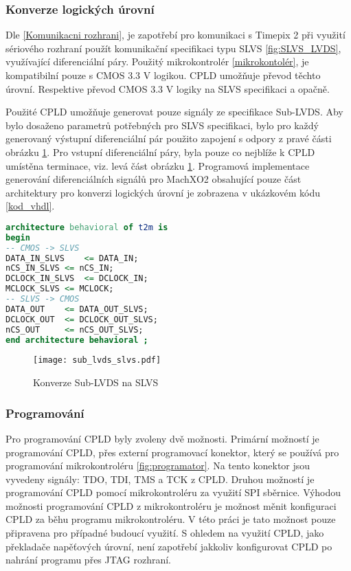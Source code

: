 	\subsubsection{Konverze logických úrovní}
	\label{CPLD konverze}
	Dle \ref{Komunikacni rozhrani}, je zapotřebí pro komunikaci s Timepix 2 při využití sériového rozhraní použít komunikační specifikaci typu SLVS \ref{fig:SLVS_LVDS}, využívající diferenciální páry. Použitý mikrokontrolér \ref{mikrokontolér}, je kompatibilní pouze s CMOS 3.3 V logikou. CPLD umožňuje převod těchto úrovní. Respektive převod CMOS 3.3 V logiky na SLVS specifikaci a opačně.
	\par Použité CPLD umožňuje generovat pouze signály ze specifikace Sub-LVDS. Aby bylo dosaženo parametrů potřebných pro SLVS specifikaci, bylo pro každý generovaný výstupní diferenciální pár použito zapojení s odpory z pravé části obrázku \ref{fig:sub_lvds_slvs}. Pro vstupní diferenciální páry, byla pouze co nejblíže k CPLD umístěna terminace, viz. levá část obrázku \ref{fig:sub_lvds_slvs}.
	Programová implementace generování diferenciálních signálů pro MachXO2 obsahující pouze část architektury pro konverzi logických úrovní je zobrazena v ukázkovém kódu \ref{kod_vhdl}.
\begin{lstlisting}[frame=single, language=VHDL, caption={Ukázkový kód ve VHDL pro CPLD}, label=kod_vhdl]
architecture behavioral of t2m is
begin
-- CMOS -> SLVS
DATA_IN_SLVS	<= DATA_IN;
nCS_IN_SLVS	<= nCS_IN;
DCLOCK_IN_SLVS	<= DCLOCK_IN;
MCLOCK_SLVS	<= MCLOCK;
-- SLVS -> CMOS
DATA_OUT	<= DATA_OUT_SLVS;
DCLOCK_OUT	<= DCLOCK_OUT_SLVS;
nCS_OUT		<= nCS_OUT_SLVS;
end architecture behavioral ;
\end{lstlisting}
	\begin{figure}[h!]
	\centering
	\captionsetup{justification=centering}
	\texttt{[image: sub\_lvds\_slvs.pdf]}
	\caption{Konverze Sub-LVDS na SLVS} 
	\label{fig:sub_lvds_slvs}
	\end{figure}
	\subsubsection{Programování}
	Pro programování CPLD byly zvoleny dvě možnosti. Primární možností je programování CPLD, přes externí programovací konektor, který se používá pro programování mikrokontroléru \ref{fig:programator}. Na tento konektor jsou vyvedeny signály: TDO, TDI, TMS a TCK z CPLD. Druhou možností je programování CPLD pomocí mikrokontroléru za využití SPI sběrnice. Výhodou možnosti programování CPLD z mikrokontroléru je možnost měnit konfiguraci CPLD za běhu programu mikrokontroléru. V této práci je tato možnost pouze připravena pro případné budoucí využití. S ohledem na využití CPLD, jako překladače napěťových úrovní, není zapotřebí jakkoliv konfigurovat CPLD po nahrání programu přes JTAG rozhraní.

